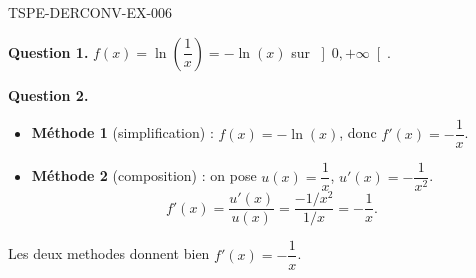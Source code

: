 \begin{corrige}{TSPE-DERCONV-EX-006}

\textbf{Question 1.} $f(x) = \ln\!\left(\dfrac{1}{x}\right) = -\ln(x)$ sur $\left]0,+\infty\right[$.


\textbf{Question 2.}
\begin{itemize}
  \item \textbf{Méthode 1} (simplification) : $f(x) = -\ln(x)$, donc $f'(x) = -\dfrac{1}{x}$.
  \item \textbf{Méthode 2} (composition) : on pose $u(x) = \dfrac{1}{x}$, $u'(x) = -\dfrac{1}{x^2}$.
  \[ f'(x) = \frac{u'(x)}{u(x)} = \frac{-1/x^2}{1/x} = -\frac{1}{x}. \]
\end{itemize}
Les deux methodes donnent bien $f'(x) = -\dfrac{1}{x}$.

\end{corrige}
